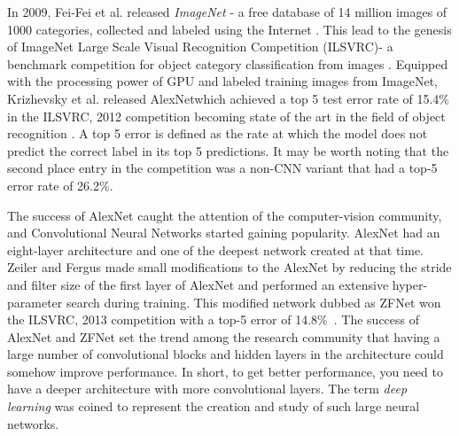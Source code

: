 In 2009, Fei-Fei et al. released \textit{ImageNet} - a free database of 14 million images of 1000 categories, collected and labeled using the Internet \cite{ImageNet2009}. This lead to the genesis of ImageNet Large Scale Visual Recognition Competition (ILSVRC)-  a benchmark competition for object category classification from images \cite{ImageNETChallenge}. Equipped with the processing power of GPU and labeled training images from ImageNet, Krizhevsky et al. released AlexNetwhich achieved a top 5 test error rate of 15.4\% in the ILSVRC, 2012 competition becoming state of the art in the field of object recognition \cite{Alexnet2012}. A top 5 error is defined as the rate at which the model does not predict the correct label in its top 5 predictions. It may be worth noting that the second place entry in the competition was a non-CNN variant that had a top-5 error rate of 26.2\%. 

The success of AlexNet caught the attention of the computer-vision community, and Convolutional Neural Networks started gaining popularity. AlexNet had an eight-layer architecture and one of the deepest network created at that time. Zeiler and Fergus made small modifications to the AlexNet by reducing the stride and filter size of the first layer of AlexNet and performed an extensive hyper-parameter search during training. This modified network dubbed as ZFNet won the  ILSVRC, 2013 competition with a top-5 error of 14.8\%~\cite{ZFNET}. The success of AlexNet and ZFNet set the trend among the research community that having a large number of convolutional blocks and hidden layers in the architecture could somehow improve performance. In short, to get better performance, you need to have a deeper architecture with more convolutional layers. The term \textit{deep learning} was coined to represent the creation and study of such large neural networks.


